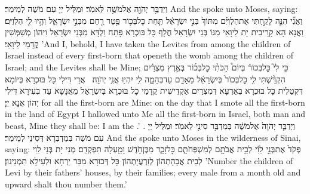 {וַיְדַבֵּ֥ר יְהֹוָ֖ה אֶל\maqqaf מֹשֶׁ֥ה לֵּאמֹֽר׃}
{וּמַלֵּיל יְיָ עִם מֹשֶׁה לְמֵימַר׃}
{And the \lord\space spoke unto Moses, saying:}{}
{וַאֲנִ֞י הִנֵּ֧ה לָקַ֣חְתִּי אֶת\maqqaf הַלְוִיִּ֗ם מִתּוֹךְ֙ בְּנֵ֣י יִשְׂרָאֵ֔ל תַּ֧חַת כׇּל\maqqaf בְּכ֛וֹר פֶּ֥טֶר רֶ֖חֶם מִבְּנֵ֣י יִשְׂרָאֵ֑ל וְהָ֥יוּ לִ֖י הַלְוִיִּֽם׃}
{וַאֲנָא הָא קָרֵיבִית יָת לֵיוָאֵי מִגּוֹ בְּנֵי יִשְׂרָאֵל חֲלָף כָּל בּוּכְרָא פָּתַח וַלְדָּא מִבְּנֵי יִשְׂרָאֵל וִיהוֹן מְשַׁמְּשִׁין קֳדָמַי לֵיוָאֵי׃}
{’And I, behold, I have taken the Levites from among the children of Israel instead of every first-born that openeth the womb among the children of Israel; and the Levites shall be Mine;}{}
{כִּ֣י לִי֮ כׇּל\maqqaf בְּכוֹר֒ בְּיוֹם֩ הַכֹּתִ֨י כׇל\maqqaf בְּכ֜וֹר בְּאֶ֣רֶץ מִצְרַ֗יִם הִקְדַּ֨שְׁתִּי לִ֤י כׇל\maqqaf בְּכוֹר֙ בְּיִשְׂרָאֵ֔ל מֵאָדָ֖ם עַד\maqqaf בְּהֵמָ֑ה לִ֥י יִהְי֖וּ אֲנִ֥י יְהֹוָֽה׃ \petucha }
{אֲרֵי דִּילִי כָּל בּוּכְרָא בְּיוֹמָא דִּקְטַלִית כָּל בּוּכְרָא בְּאַרְעָא דְּמִצְרַיִם אַקְדֵּישִׁית קֳדָמַי כָל בּוּכְרָא בְּיִשְׂרָאֵל מֵאֲנָשָׁא עַד בְּעִירָא דִּילִי יְהוֹן אֲנָא יְיָ׃}
{for all the first-born are Mine: on the day that I smote all the first-born in the land of Egypt I hallowed unto Me all the first-born in Israel, both man and beast, Mine they shall be: I am the \lord.’ .}{}
{וַיְדַבֵּ֤ר יְהֹוָה֙ אֶל\maqqaf מֹשֶׁ֔ה בְּמִדְבַּ֥ר סִינַ֖י לֵאמֹֽר׃}
{וּמַלֵּיל יְיָ עִם מֹשֶׁה בְּמַדְבְּרָא דְּסִינַי לְמֵימַר׃}
{And the \lord\space spoke unto Moses in the wilderness of Sinai, saying:}{}
{פְּקֹד֙ אֶת\maqqaf בְּנֵ֣י לֵוִ֔י לְבֵ֥ית אֲבֹתָ֖ם לְמִשְׁפְּחֹתָ֑ם כׇּל\maqqaf זָכָ֛ר מִבֶּן\maqqaf חֹ֥דֶשׁ וָמַ֖עְלָה תִּפְקְדֵֽם׃}
{מְנִי יָת בְּנֵי לֵוִי לְבֵית אֲבָהָתְהוֹן לְזַרְעֲיָתְהוֹן כָּל דְּכוּרָא מִבַּר יַרְחָא וּלְעֵילָא תִּמְנֵינוּן׃}
{’Number the children of Levi by their fathers’ houses, by their families; every male from a month old and upward shalt thou number them.’}{}
